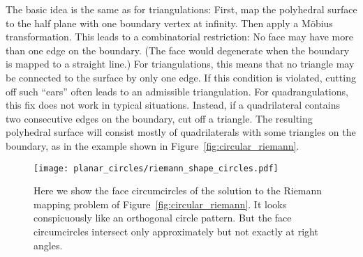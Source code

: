 \documentclass[Thesis]{subfiles}
\begin{document}
The basic idea is the same as for triangulations: First, map the
polyhedral surface to the half plane with one boundary vertex at
infinity. Then apply a M{\"o}bius transformation. This leads to a
combinatorial restriction: No face may have more than one edge on the
boundary. (The face would degenerate when the boundary is mapped to a
straight line.) For triangulations, this means that no triangle may be
connected to the surface by only one edge. If this condition is
violated, cutting off such ``ears'' often leads to an admissible
triangulation. For quadrangulations, this fix does not work in typical
situations. Instead, if a quadrilateral contains two consecutive edges
on the boundary, cut off a triangle. The resulting polyhedral surface
will consist mostly of quadrilaterals with some triangles on the
boundary, as in the example shown in Figure~\ref{fig:circular_riemann}.

\begin{figure}
  \centering
  \texttt{[image: planar\_circles/riemann\_shape\_circles.pdf]}\\
  \caption{Here we show the face circumcircles of the solution to the
    Riemann mapping problem of Figure~\ref{fig:circular_riemann}. It
    looks conspicuously like an orthogonal circle pattern. But the
    face circumcircles intersect only approximately but not exactly at
    right angles.}
  \label{fig:riemann_circles}
\end{figure}

\end{document}
